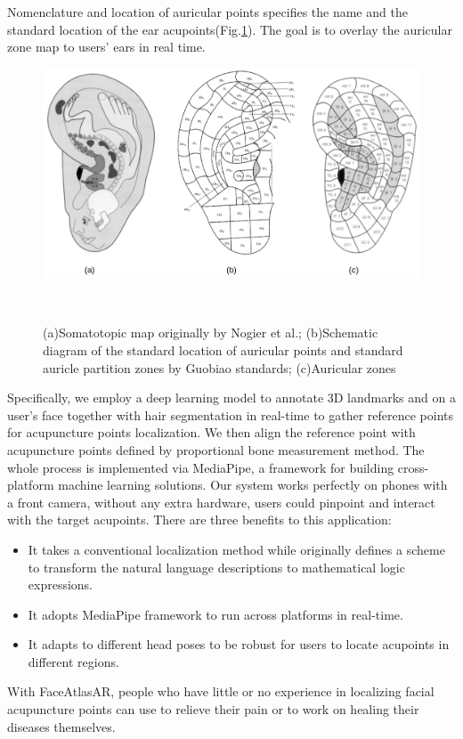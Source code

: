 Nomenclature and location of auricular points\cite{GBT13734} specifies the name and the standard location of the ear acupoints(Fig.\ref{fig:GBT13734}). The goal is to overlay the auricular zone map to users' ears in real time.
\begin{figure}
  \centering
    \includegraphics[width=0.9\columnwidth]{figures/zones.png}
    \caption{(a)Somatotopic map originally by Nogier et al.\cite{nogier1983auriculotherapy}; (b)Schematic diagram of the standard location of auricular points and standard auricle partition zones by Guobiao standards\cite{GBT13734}; (c)Auricular zones}~\label{fig:GBT13734}
  \end{figure}


Specifically, we employ a deep learning model to annotate 3D landmarks and on a user’s face together with hair segmentation in real-time to gather reference points for acupuncture points localization. We then align the reference point with acupuncture points defined by proportional bone measurement method. The whole process is implemented via MediaPipe, a framework for building cross-platform machine learning solutions. Our system works perfectly on phones with a front camera, without any extra hardware, users could pinpoint and interact with the target acupoints. There are three benefits to this application:
\begin{itemize}
  \item It takes a conventional localization method while originally defines a scheme to transform the natural language descriptions to mathematical logic expressions.
  \item It adopts MediaPipe framework to run across platforms in real-time.
  \item It adapts to different head poses to be robust for users to locate acupoints in different regions.
\end{itemize}
With FaceAtlasAR, people who have little or no experience in localizing facial acupuncture points can use to relieve their pain or to work on healing their diseases themselves.

